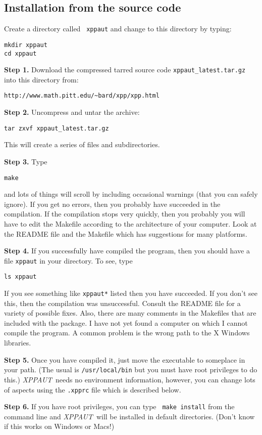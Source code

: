 \documentclass{article}
\newcommand{\XPP}{{\sl XPPAUT\, }}
\begin{document}
\subsection{Installation from the source code}
\begin{description}
\item Create a directory called {\tt
xppaut} and change to this directory by typing:
\begin{verbatim}
mkdir xppaut
cd xppaut
\end{verbatim}
\item{\bf Step 1.} Download the compressed tarred
source code {\tt xppaut\_latest.tar.gz} into this directory
 from:
\begin{verbatim}
http://www.math.pitt.edu/~bard/xpp/xpp.html
\end{verbatim}

\item{\bf Step 2.} Uncompress and untar the archive:
\begin{verbatim}
tar zxvf xppaut_latest.tar.gz
\end{verbatim}
This will create a series of files and subdirectories.
\item{\bf Step 3.}  Type
\begin{verbatim}
make
\end{verbatim}
and lots of things will scroll by including occasional warnings (that
you
can safely ignore).  If you get no errors, then you probably have
succeeded in the compilation. If the compilation stops very quickly,
then you probably you will have to edit the Makefile according to the
architecture of your computer.  Look at the README file and the
Makefile which has suggestions for many platforms. 
\item{\bf Step 4.} If you successfully have compiled the program, then
you should have a
file {\tt xppaut} in your directory. To see, type
\begin{verbatim}
ls xppaut
\end{verbatim}
If you see something like {\tt xppaut*} listed then you have
succeeded. If you don't see this, then the compilation was
unsuccessful. Consult the README file for a variety of possible
fixes. Also, there are many comments in the Makefiles that are
included with the package. 
I have not yet found a computer on which I cannot compile the
program. A common problem is the wrong path to the X Windows
libraries. 

\item{\bf Step 5.} Once you have
compiled it, just move the executable to someplace in your path. (The
usual is {\tt /usr/local/bin} but you must have root privileges to do
this.) \XPP needs no environment information, however, you can change
lots of aspects using the  {\tt .xpprc} file which is described below. 
\item {\bf Step 6.}  If you have root privileges, you can type {\tt
make install} from the command line and \XPP will be installed in
default directories. (Don't know if this works on Windows or Macs!)
\end{description}
\end{document}
